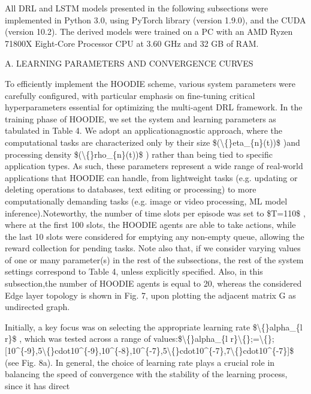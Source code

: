 \documentclass{article}
\begin{document}
All DRL and LSTM models presented in the following subsections were implemented in Python 3.0, using PyTorch library (version 1.9.0), and the CUDA (version 10.2). The derived models were trained on a PC with an AMD Ryzen 71800X Eight-Core Processor CPU at 3.60 GHz and 32 GB of RAM.

A. LEARNING PARAMETERS AND CONVERGENCE CURVES

To efficiently implement the HOODIE scheme, various system parameters were carefully configured, with particular emphasis on fine-tuning critical hyperparameters essential for optimizing the multi-agent DRL framework. In the training phase of HOODIE, we set the system and learning parameters as tabulated in Table 4. We adopt an applicationagnostic approach, where the computational tasks are characterized only by their size \$(\textbackslash\{\}eta\_\{n\}(t))\$ )and processing density \$(\textbackslash\{\}rho\_\{n\}(t))\$ ) rather than being tied to specific application types. As such, these parameters represent a wide range of real-world applications that HOODIE can handle, from lightweight tasks (e.g. updating or deleting operations to databases, text editing or processing) to more computationally demanding tasks (e.g. image or video processing, ML model inference).Noteworthy, the number of time slots per episode was set to \$T=110\$ , where at the first 100 slots, the HOODIE agents are able to take actions, while the last 10 slots were considered for emptying any non-empty queue, allowing the reward collection for pending tasks. Note also that, if we consider varying values of one or many parameter(s) in the rest of the subsections, the rest of the system settings correspond to Table 4, unless explicitly specified. Also, in this subsection,the number of HOODIE agents is equal to 20, whereas the considered Edge layer topology is shown in Fig. 7, upon plotting the adjacent matrix G as undirected graph.

Initially, a key focus was on selecting the appropriate learning rate \$\textbackslash\{\}alpha\_\{l r\}\$ , which was tested across a range of values:\$\textbackslash\{\}alpha\_\{l r\}\textbackslash\{\};=\textbackslash\{\};[10\textasciicircum{}\{-9\},5\textbackslash\{\}cdot10\textasciicircum{}\{-9\},10\textasciicircum{}\{-8\},10\textasciicircum{}\{-7\},5\textbackslash\{\}cdot10\textasciicircum{}\{-7\},7\textbackslash\{\}cdot10\textasciicircum{}\{-7\}]\$ (see Fig. 8a). In general, the choice of learning rate plays a crucial role in balancing the speed of convergence with the stability of the learning process, since it has direct
\end{document}

